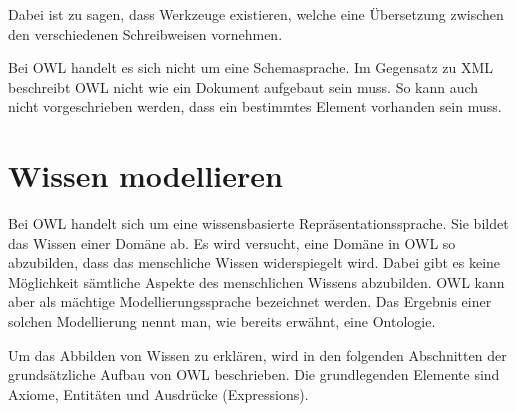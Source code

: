 Dabei ist zu sagen, dass Werkzeuge existieren, welche eine Übersetzung zwischen den verschiedenen Schreibweisen vornehmen.

Bei OWL handelt es sich nicht um eine Schemasprache. Im Gegensatz zu XML beschreibt OWL nicht wie ein Dokument aufgebaut sein muss. So kann auch nicht vorgeschrieben werden, dass ein bestimmtes Element vorhanden sein muss.

\section{Wissen modellieren}
\label{sec:owl_owl_wissenModellieren}
Bei OWL handelt sich um eine wissensbasierte Repräsentationssprache. Sie bildet das Wissen einer Domäne ab. Es wird versucht, eine Domäne in OWL so abzubilden, dass das menschliche Wissen widerspiegelt wird. Dabei gibt es keine Möglichkeit sämtliche Aspekte des menschlichen Wissens abzubilden. OWL kann aber als mächtige Modellierungssprache bezeichnet werden. Das Ergebnis einer solchen Modellierung nennt man, wie bereits erwähnt, eine Ontologie.

Um das Abbilden von Wissen zu erklären, wird in den folgenden Abschnitten der grundsätzliche Aufbau von OWL beschrieben. Die grundlegenden Elemente sind Axiome, Entitäten und Ausdrücke (Expressions).

